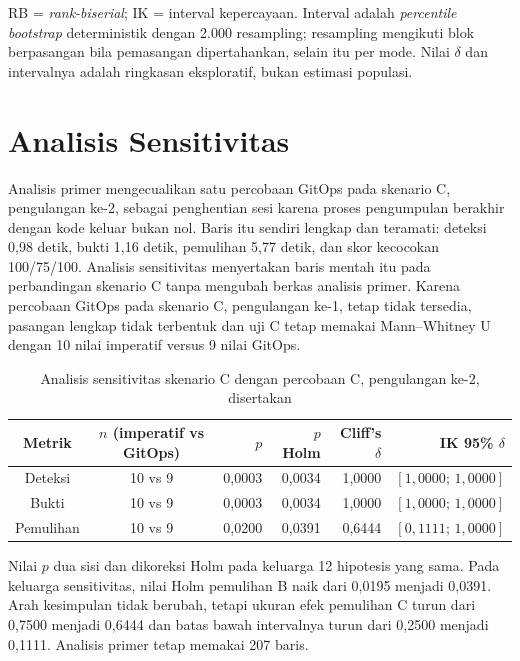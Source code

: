 \noindent\footnotesize RB = \textit{rank-biserial}; IK = interval kepercayaan. Interval adalah \textit{percentile bootstrap} deterministik dengan 2.000 resampling; resampling mengikuti blok berpasangan bila pemasangan dipertahankan, selain itu per mode. Nilai $\delta$ dan intervalnya adalah ringkasan eksploratif, bukan estimasi populasi.\normalsize

\section{Analisis Sensitivitas}

Analisis primer mengecualikan satu percobaan GitOps pada skenario C, pengulangan ke-2, sebagai penghentian sesi karena proses pengumpulan berakhir dengan kode keluar bukan nol. Baris itu sendiri lengkap dan teramati: deteksi 0,98 detik, bukti 1,16 detik, pemulihan 5,77 detik, dan skor kecocokan 100/75/100. Analisis sensitivitas menyertakan baris mentah itu pada perbandingan skenario C tanpa mengubah berkas analisis primer. Karena percobaan GitOps pada skenario C, pengulangan ke-1, tetap tidak tersedia, pasangan lengkap tidak terbentuk dan uji C tetap memakai Mann--Whitney U dengan 10 nilai imperatif versus 9 nilai GitOps.

\begin{table}[H]
  \centering
  \small
  \caption{Analisis sensitivitas skenario C dengan percobaan C, pengulangan ke-2, disertakan}
  \label{tab:lampiran-b-sensitivitas}
  \begin{tabularx}{\textwidth}{|c|c|r|r|r|r|}
    \hline
    Metrik & $n$ (imperatif vs GitOps) & $p$ & $p$ Holm & Cliff's $\delta$ & IK 95\% $\delta$ \\
    \hline
    Deteksi & 10 vs 9 & 0,0003 & 0,0034 & 1,0000 & $[1,0000;\,1,0000]$ \\
    \hline
    Bukti & 10 vs 9 & 0,0003 & 0,0034 & 1,0000 & $[1,0000;\,1,0000]$ \\
    \hline
    Pemulihan & 10 vs 9 & 0,0200 & 0,0391 & 0,6444 & $[0,1111;\,1,0000]$ \\
    \hline
  \end{tabularx}
\end{table}

\noindent\footnotesize Nilai $p$ dua sisi dan dikoreksi Holm pada keluarga 12 hipotesis yang sama. Pada keluarga sensitivitas, nilai Holm pemulihan B naik dari 0,0195 menjadi 0,0391. Arah kesimpulan tidak berubah, tetapi ukuran efek pemulihan C turun dari 0,7500 menjadi 0,6444 dan batas bawah intervalnya turun dari 0,2500 menjadi 0,1111. Analisis primer tetap memakai 207 baris.\normalsize


